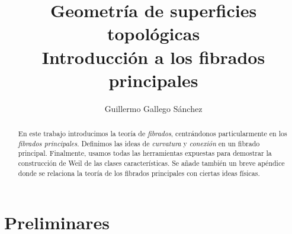 \documentclass[12pt,a4paper]{article}
\title{\textbf{Geometría de superficies topológicas} \\ Introducción a los fibrados principales}
\author{Guillermo Gallego Sánchez}
\date{}
\theoremstyle{definition} \newtheorem{defn}[thm]{Definición}
\theoremstyle{definition} \newtheorem{ejemplo}[thm]{Ejemplo}
\theoremstyle{definition} \newtheorem{ejercicio}[thm]{Ejercicio}
\theoremstyle{remark} \newtheorem*{obs}{Observación}
\begin{document}
\maketitle
\begin{abstract}
  En este trabajo introducimos la teoría de \textit{fibrados}, centrándonos particularmente en los \textit{fibrados principales}. Definimos las ideas de \textit{curvatura} y \textit{conexión} en un fibrado principal. Finalmente, usamos todas las herramientas expuestas para demostrar la construcción de Weil de las clases características. Se añade también un breve apéndice donde se relaciona la teoría de los fibrados principales con ciertas ideas físicas.
\end{abstract}

\tableofcontents

\section{Preliminares}
\end{document}
